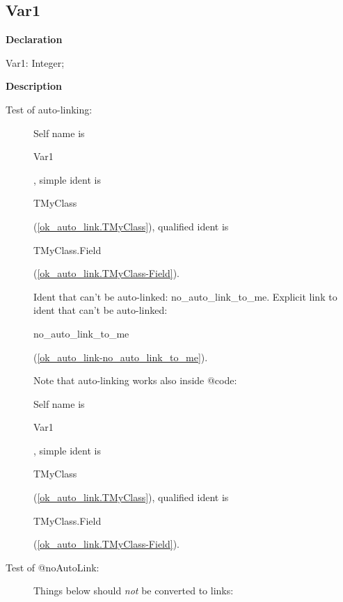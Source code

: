 \documentclass{report}
\begin{document}
\subsection*{Var1}
\begin{list}{}{
\setlength{\itemindent}{0cm}
\setlength{\listparindent}{0cm}
\setlength{\leftmargin}{\evensidemargin}
\addtolength{\leftmargin}{\tmplength}
\settowidth{\labelsep}{X}
\addtolength{\leftmargin}{\labelsep}
\setlength{\labelwidth}{\tmplength}
}
\begin{flushleft}
\item[\textbf{Declaration}\hfill]
\begin{ttfamily}
Var1: Integer;\end{ttfamily}


\end{flushleft}
\par
\item[\textbf{Description}]
\begin{description}
\item[Test of auto{-}linking:]  Self name is \begin{ttfamily}Var1\end{ttfamily}, simple ident is \begin{ttfamily}TMyClass\end{ttfamily}(\ref{ok_auto_link.TMyClass}), qualified ident is \begin{ttfamily}TMyClass.Field\end{ttfamily}(\ref{ok_auto_link.TMyClass-Field}).

Ident that can't be auto{-}linked: no{\_}auto{\_}link{\_}to{\_}me. Explicit link to ident that can't be auto{-}linked: \begin{ttfamily}no{\_}auto{\_}link{\_}to{\_}me\end{ttfamily}(\ref{ok_auto_link-no_auto_link_to_me}).

Note that auto{-}linking works also inside @code:

\begin{ttfamily} Self name is \begin{ttfamily}Var1\end{ttfamily}, simple ident is \begin{ttfamily}TMyClass\end{ttfamily}(\ref{ok_auto_link.TMyClass}), qualified ident is \begin{ttfamily}TMyClass.Field\end{ttfamily}(\ref{ok_auto_link.TMyClass-Field}). \end{ttfamily} 
\item[Test of @noAutoLink:]  Things below should \textit{not} be converted to links:


\end{description}
\end{list}
\end{document}

